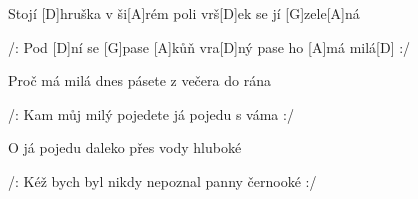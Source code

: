 
Stojí [D]hruška v ši[A]rém poli
vrš[D]ek se jí [G]zele[A]ná

/: Pod [D]ní se [G]pase [A]kůň vra[D]ný
pase ho [A]má milá[D] :/

Proč má milá dnes pásete
z večera do rána

/: Kam můj milý pojedete
já pojedu s váma :/

O já pojedu daleko
přes vody hluboké

/: Kéž bych byl nikdy nepoznal
panny černooké :/

